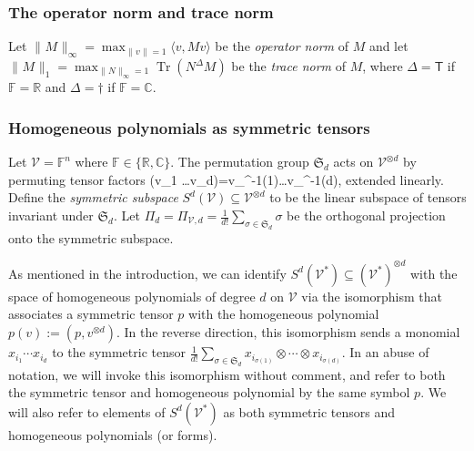 \documentclass[11pt]{article}
\numberwithin{theorem}{section}
\theoremstyle{definition}
\newcommand{\tinyspace}{\mspace{1mu}}
\newcommand{\tr}{\operatorname{Tr}}
\renewcommand{\t}{{\scriptscriptstyle\mathsf{T}}}
\newcommand{\ip}[2]{\langle #1 , #2\rangle}
\newcommand{\norm}[1]{\lVert\tinyspace #1 \tinyspace\rVert}
\newcommand{\I}{\mathds{1}}
\newcommand{\setft}[1]{\mathrm{#1}}
\newcommand{\Pos}{\setft{Pos}}
\newcommand{\Unitary}{\setft{U}}
\newcommand{\Herm}{\setft{Herm}}
\newcommand{\complex}{\mathbb{C}}
\newcommand{\field}{\mathbb{F}}
\newcommand{\real}{\mathbb{R}}
\newcommand\V{\mathcal{V}}
\newcommand{\End}{\setft{End}}
\newcommand{\dg}{\dagger}
\newcommand{\ootimes}{ \otimes \cdots \otimes }
\newcommand{\frakS}{\mathfrak{S}}
\def\ba#1\ea{\begin{align}#1\end{align}}
\newcommand{\Vc}{\V_{\complex}}
\newcommand{\Vr}{\V_{\real}}
\begin{document}






\subsubsection*{The operator norm and trace norm}

Let $\norm{M}_{\infty}= \max_{\norm{v}=1} \ip{v}{Mv}$ be the \textit{operator norm} of $M$ and let $\norm{M}_1=\max_{\norm{N}_\infty=1} \tr(N^{\Delta} M)$ be the \textit{trace norm} of $M$, where $\Delta=\t$ if $\field=\real$ and $\Delta=\dg$ if $\field=\complex$.



\subsubsection*{Homogeneous polynomials as symmetric tensors}

Let $\V=\field^n$ where $\field \in \{\real, \complex\}$. The permutation group $\frakS_d$ acts on $\V^{\otimes d}$ by permuting tensor factors
\ba
\sigma \cdot (v_1 \otimes \dots \otimes v_{d})=v_{\sigma^{-1}(1)}\otimes \dots \otimes v_{\sigma^{-1}(d)},
\ea
extended linearly. Define the \textit{symmetric subspace} $S^{d}(\V) \subseteq \V^{\otimes d}$ to be the linear subspace of tensors invariant under $\frakS_d$. Let $\Pi_d=\Pi_{\V,d} = \frac{1}{d!} \sum_{\sigma \in \frakS_d} \sigma $ be the orthogonal projection onto the symmetric subspace.
%
%


As mentioned in the introduction, we can identify $S^{d}(\V^*)\subseteq (\V^*)^{\otimes d}$ with the space of homogeneous polynomials of degree $d$ on $\V$ via the isomorphism that associates a symmetric tensor $p$ with the homogeneous polynomial $p(v):=(p, v^{\otimes d})$. In the reverse direction, this isomorphism sends a monomial $x_{i_1}\cdots x_{i_d}$ to the symmetric tensor $\frac{1}{d!} \sum_{\sigma \in \frakS_d} x_{i_{\sigma(1)}} \ootimes x_{i_{\sigma(d)}}$. In an abuse of notation, we will invoke this isomorphism without comment, and refer to both the symmetric tensor and homogeneous polynomial by the same symbol $p$. We will also refer to elements of $S^d(\V^*)$ as both symmetric tensors and homogeneous polynomials (or forms).
\end{document}

